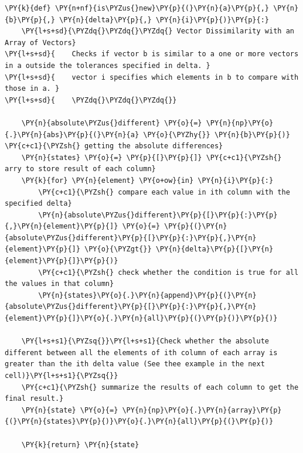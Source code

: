 \documentclass[a4paper,11pt]{article}%
\begin{document}
    \begin{tcolorbox}[breakable, size=fbox, boxrule=1pt, pad at break*=1mm,colback=cellbackground, colframe=cellborder]
\begin{Verbatim}[commandchars=\\\{\}]
\PY{k}{def} \PY{n+nf}{is\PYZus{}new}\PY{p}{(}\PY{n}{a}\PY{p}{,} \PY{n}{b}\PY{p}{,} \PY{n}{delta}\PY{p}{,} \PY{n}{i}\PY{p}{)}\PY{p}{:}
    \PY{l+s+sd}{\PYZdq{}\PYZdq{}\PYZdq{} Vector Dissimilarity with an Array of Vectors}
\PY{l+s+sd}{    Checks if vector b is similar to a one or more vectors in a outside the tolerances specified in delta. }
\PY{l+s+sd}{    vector i specifies which elements in b to compare with those in a. }
\PY{l+s+sd}{    \PYZdq{}\PYZdq{}\PYZdq{}}

    \PY{n}{absolute\PYZus{}different} \PY{o}{=} \PY{n}{np}\PY{o}{.}\PY{n}{abs}\PY{p}{(}\PY{n}{a} \PY{o}{\PYZhy{}} \PY{n}{b}\PY{p}{)} \PY{c+c1}{\PYZsh{} getting the absolute differences}
    \PY{n}{states} \PY{o}{=} \PY{p}{[}\PY{p}{]} \PY{c+c1}{\PYZsh{} arry to store result of each column}
    \PY{k}{for} \PY{n}{element} \PY{o+ow}{in} \PY{n}{i}\PY{p}{:}
        \PY{c+c1}{\PYZsh{} compare each value in ith column with the specified delta}
        \PY{n}{absolute\PYZus{}different}\PY{p}{[}\PY{p}{:}\PY{p}{,}\PY{n}{element}\PY{p}{]} \PY{o}{=} \PY{p}{(}\PY{n}{absolute\PYZus{}different}\PY{p}{[}\PY{p}{:}\PY{p}{,}\PY{n}{element}\PY{p}{]} \PY{o}{\PYZgt{}} \PY{n}{delta}\PY{p}{[}\PY{n}{element}\PY{p}{]}\PY{p}{)}
        \PY{c+c1}{\PYZsh{} check whether the condition is true for all the values in that column}
        \PY{n}{states}\PY{o}{.}\PY{n}{append}\PY{p}{(}\PY{n}{absolute\PYZus{}different}\PY{p}{[}\PY{p}{:}\PY{p}{,}\PY{n}{element}\PY{p}{]}\PY{o}{.}\PY{n}{all}\PY{p}{(}\PY{p}{)}\PY{p}{)}

    \PY{l+s+s1}{\PYZsq{}}\PY{l+s+s1}{Check whether the absolute different between all the elements of ith column of each array is greater than the ith delta value (See thee example in the next cell)}\PY{l+s+s1}{\PYZsq{}}
    \PY{c+c1}{\PYZsh{} summarize the results of each column to get the final result.}
    \PY{n}{state} \PY{o}{=} \PY{n}{np}\PY{o}{.}\PY{n}{array}\PY{p}{(}\PY{n}{states}\PY{p}{)}\PY{o}{.}\PY{n}{all}\PY{p}{(}\PY{p}{)}

    \PY{k}{return} \PY{n}{state}
\end{Verbatim}
\end{tcolorbox}
\pagebreak
\end{document}
